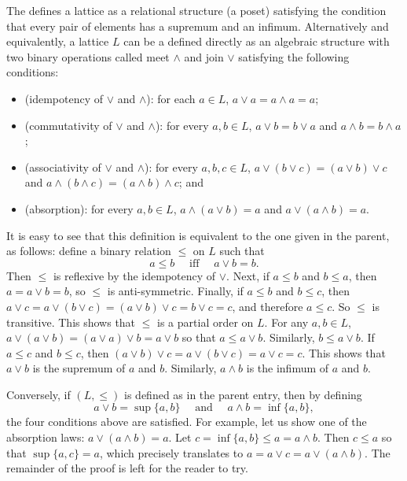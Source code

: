 \documentclass[12pt]{article}
\begin{document}

The  defines a lattice as a relational structure (a poset) satisfying the condition that every pair of elements has a supremum and an infimum.  Alternatively and equivalently, a lattice $L$ can be a defined directly as an algebraic structure with two binary operations called meet $\wedge$ and join $\vee$ satisfying the following conditions:
\begin{itemize}
\item (idempotency of $\vee$ and $\wedge$): for each $a\in L$, $a\vee a=a\wedge a=a$;
\item (commutativity of $\vee$ and $\wedge$): for every $a,b\in L$, $a\vee b=b\vee a$ and $a\wedge b=b\wedge a$;
\item (associativity of $\vee$ and $\wedge$): for every $a,b,c\in L$, $a\vee(b\vee c)=(a\vee b)\vee c$ and $a\wedge (b\wedge c)=(a\wedge b)\wedge c$; and
\item (absorption): for every $a,b\in L$, $a\wedge (a\vee b)=a$ and $a\vee (a\wedge b)=a$.
\end{itemize}

It is easy to see that this definition is equivalent to the one given in the parent, as follows: define a binary relation $\le$ on $L$ such that $$a\le b\quad\mbox{ iff }\quad a\vee b=b.$$  Then $\le$ is reflexive by the idempotency of $\vee$.  Next, if $a\le b$ and $b\le a$, then $a=a\vee b=b$, so $\le$ is anti-symmetric.  Finally, if $a\le b$ and $b\le c$, then $a\vee c= a\vee (b\vee c)=(a\vee b)\vee c=b\vee c=c$, and therefore $a\le c$.  So $\le$ is transitive.  This shows that $\le$ is a partial order on $L$.  For any $a,b\in L$, $a\vee (a\vee b)=(a\vee a)\vee b=a\vee b$ so that $a\le a\vee b$.  Similarly, $b\le a\vee b$.  If $a\le c$ and $b\le c$, then $(a\vee b)\vee c = a\vee (b\vee c)=a\vee c=c$.  This shows that $a\vee b$ is the supremum of $a$ and $b$.  Similarly, $a\wedge b$ is the infimum of $a$ and $b$.

Conversely, if $(L,\le)$ is defined as in the parent entry, then by defining $$a\vee b = \sup\lbrace a,b\rbrace \quad \mbox{ and } \quad a\wedge b=\inf\lbrace a,b\rbrace,$$
the four conditions above are satisfied.  For example, let us show one of the absorption laws: $a\vee (a\wedge b)=a$.  Let $c=\inf\lbrace a,b\rbrace \le a=a\wedge b$.  Then $c\le a$ so that $\sup\lbrace a,c\rbrace=a$, which precisely translates to $a=a\vee c=a\vee(a\wedge b)$.  The remainder of the proof is left for the reader to try.
\end{document}

